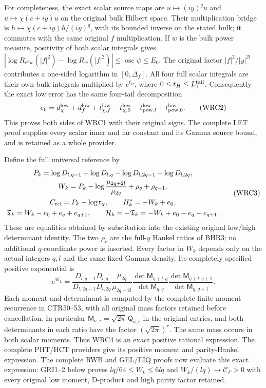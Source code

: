 \documentclass[11pt,a4paper]{article}
\begin{document}
For completeness, the exact scalar source maps are
$u\mapsto(iy)^q u$ and $u\mapsto\chi(c+iy)u$ on the
original bulk Hilbert space. Their multiplication bridge
is $h\mapsto\chi(c+iy)h/(iy)^q$, with its bounded inverse
on the stated bulk; it commutes with the same original
$f$ multiplication. If $w$ is the bulk power measure,
positivity of both scalar integrals gives
$|\log R_{e^\psi w}(|f|^2)-\log R_w(|f|^2)|
\leq\operatorname{osc}\psi\leq E_0$.
The original factor $|f|^2/|y|^{2l}$ contributes a
one-sided logarithm in $[0,\Delta_f]$.
All four full scalar integrals are their own bulk integrals
multiplied by $e^{t_H}$, where $0\leq t_H\leq L_1^{\rm tail}$.
Consequently the exact low error has the same four-tail
decomposition
\[
 e_0=d_\chi^{\rm low}+d_f^{\rm low}
  +t_{\chi,f}^{\rm low}-t_{\chi,0}^{\rm low}
  -t_{{\rm pow},l}^{\rm low}+t_{{\rm pow},0}^{\rm low}.
 \tag{WRC2}
\]
This proves both sides of WRC1 with their original signs.
The complete LET proof supplies every scalar inner and far
constant and its Gamma source bound, and is retained as a
whole provider.

Define the full universal reference by
\[
\begin{gathered}
 P_k=\log D_{l,q-1}+\log D_{l,q}
                     -\log D_{l,2q-1}-\log D_{l,2q},\\
 W_k=P_k-\log\frac{\mu_{2q+2l}}{\mu_{2q}}
                                  +\rho_q+\rho_{q+1},\\
 C_{\rm rel}=P_k-\log\mathfrak r_\chi,\qquad
 H_k^*=-W_k+e_0,\\
 \mathfrak T_k=W_k-e_0+e_q+e_{q+1},\qquad
 \mathcal H_k=-\mathfrak T_k=-W_k+e_0-e_q-e_{q+1}.
\end{gathered}\tag{WRC3}
\]
These are equalities obtained by substitution into the
existing original low/high determinant identity. The
two $\rho_r$ are the full-$y$ Hankel ratios of BHR3;
no additional $q$-coordinate power is inserted.
Every factor in $W_k$ depends only on the actual integers
$q,l$ and the same fixed Gamma density. Its completely
specified positive exponential is
\[
 e^{W_k}=
 \frac{D_{l,q-1}D_{l,q}}{D_{l,2q-1}D_{l,2q}}
 \frac{\mu_{2q}}{\mu_{2q+2l}}
 \frac{\det\mathsf M_{q+l,q}}{\det\mathsf M_{q,q}}
 \frac{\det\mathsf M_{q+l,q+1}}{\det\mathsf M_{q,q+1}}.
 \tag{WRC4}
\]
Each moment and determinant is computed by the complete
finite moment recurrence in CTR50--53, with all original
mass factors retained before cancellation. In particular
$\mathsf M_{a,r}=\sqrt{2\pi}\,\mathsf Q_{a,r}$ in the
original entries, and both determinants in each ratio
have the factor $(\sqrt{2\pi})^r$.
The same mass occurs in both scalar moments.
Thus WRC4 is an exact positive rational expression.
The complete PHT/HCT providers give its positive moment
and parity-Hankel expression. The complete RWB and GEL/EIQ
proofs now evaluate this exact expression: GRI1--2 below proves
$lq/64\leq W_k\leq6lq$ and
$W_k/(lq)\to\mathcal C_\Gamma>0$ with every original
low moment, D-product and high parity factor retained.
\end{document}
